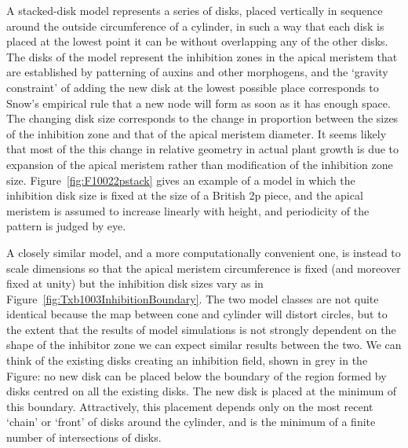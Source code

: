 A stacked-disk model represents a series of disks, placed vertically in sequence around the outside circumference of a cylinder, in such a way that each disk is placed at the lowest point it can be without overlapping any of the other disks. The disks of the model represent the inhibition zones in the apical meristem that are established by patterning of auxins and other morphogens, and the `gravity constraint' of adding the new disk at the lowest possible place corresponds to Snow's empirical rule that a new node will form as soon as it has enough space. The changing disk size corresponds to the change in proportion between the sizes of the inhibition zone and that of the apical meristem
 diameter. It seems likely that most of the this change in relative geometry in actual plant growth is due to expansion of the apical meristem rather than modification of the inhibition zone size. Figure~\ref{fig:F10022pstack} gives an example of a model in which the inhibition disk size is fixed at the size of a British 2p piece, and the apical meristem is assumed to increase linearly with height, and periodicity of the pattern is judged by eye. 



A closely similar model, and a more computationally convenient one, is instead to scale dimensions so that the apical meristem circumference is fixed (and moreover fixed at unity) but the inhibition disk sizes vary as in Figure~\ref{fig:Txb1003InhibitionBoundary}. The two model classes are not quite identical because the map between cone and cylinder will distort circles, but to the extent that the results of model simulations is not strongly dependent on the shape of the inhibitor zone we can expect similar results between the two.
 We can 
think of the existing disks creating an inhibition field, shown in grey in the Figure: no new disk can be placed below the boundary of the region formed by disks centred on all the existing disks. The new disk is placed at the minimum of this boundary.  Attractively, this placement depends only on the most recent `chain' or `front' of disks around the cylinder, and is the minimum of a finite number of intersections of disks. 


